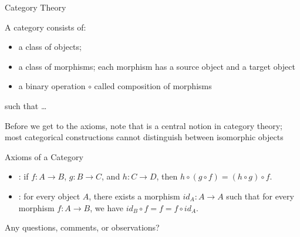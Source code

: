 \documentclass[11pt]{beamer}
\newcommand{\red}[1]{{\color{red}{#1}}}
\begin{document}
\begin{frame}{Category Theory}

A category consists of:

\begin{itemize}

\vfill\item a class of objects;

\vfill\item a class of morphisms; each morphism has a source object and a
target object

\vfill\item a binary operation $\circ$ called composition of morphisms 

\end{itemize}

such that \ldots

\vfill Before we get to the axioms, note that \red{isomorphism} is a central
notion in category theory; most categorical constructions cannot distinguish
between isomorphic objects

\vfill

\end{frame}

\begin{frame}{Axioms of a Category}

\begin{itemize}

\vfill\item \red{Associativity}: if $f : A \rightarrow B$, $g : B
  \rightarrow C$, and $h : C \rightarrow D$, then $h \circ (g \circ f) = 
  (h \circ g) \circ f$.

\vfill\item \red{Identity}: for every object $A$, there exists a morphism 
  $\mathit{id}_A : A \rightarrow A$ such that for every morphism 
  $f : A \rightarrow B$, we have 
  $\mathit{id}_B \circ f = f = f \circ \mathit{id}_A$.

\end{itemize}

\vfill

\pause Any questions, comments, or observations?

\vfill

\end{frame}
\end{document}
